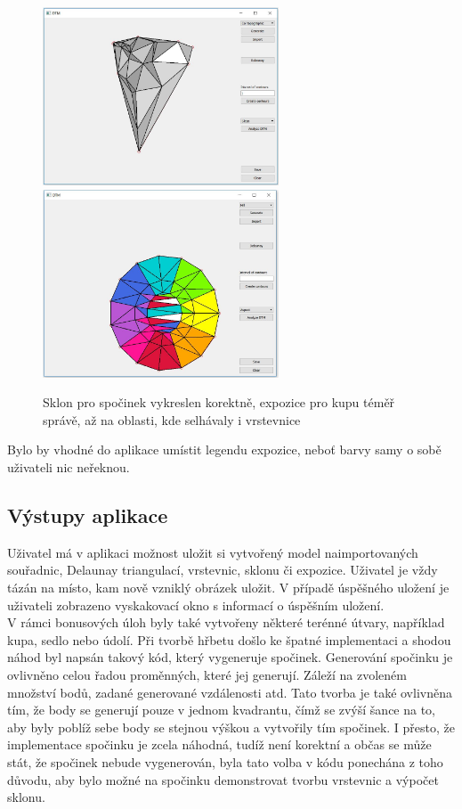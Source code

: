 \documentclass[a4paper, 12pt]{article}
\begin{document}
\begin{figure}[h!]
\centering
\includegraphics[width=7cm]{pictures/spocinek_sklon.jpg}
\includegraphics[width=7cm]{pictures/hill_aspect.jpg}
\caption{Sklon pro spočinek vykreslen korektně, expozice pro kupu téměř správě, až na oblasti, kde selhávaly i vrstevnice}
\end{figure}

Bylo by vhodné do aplikace umístit legendu expozice, neboť barvy samy o sobě uživateli nic neřeknou.

\subsection{Výstupy aplikace}
Uživatel má v aplikaci možnost uložit si vytvořený model naimportovaných souřadnic, Delaunay triangulací, vrstevnic, sklonu či expozice. Uživatel je vždy tázán na místo, kam nově vzniklý obrázek uložit. V případě úspěšného uložení je uživateli zobrazeno vyskakovací okno s informací o úspěšním uložení. \\

V rámci bonusových úloh byly také vytvořeny některé terénné útvary, například kupa, sedlo nebo údolí. Při tvorbě hřbetu došlo ke špatné implementaci a shodou náhod byl napsán takový kód, který vygeneruje spočinek. Generování spočinku je ovlivněno celou řadou proměnných, které jej generují. Záleží na zvoleném množství bodů, zadané generované vzdálenosti atd. Tato tvorba je také ovlivněna tím, že body se generují pouze v jednom kvadrantu, čímž se zvýší šance na to, aby byly poblíž sebe body se stejnou výškou a vytvořily tím spočinek. I přesto, že implementace spočinku je zcela náhodná, tudíž není korektní a občas se může stát, že spočinek nebude vygenerován, byla tato volba v kódu ponechána z toho důvodu, aby bylo možné na spočinku demonstrovat tvorbu vrstevnic a výpočet sklonu. \\ 
\end{document}
